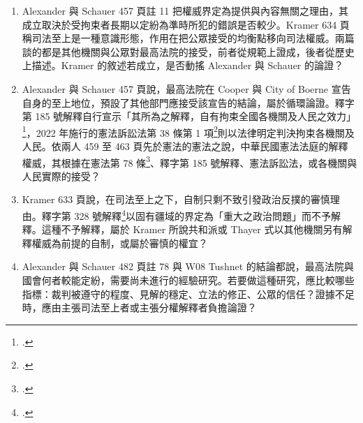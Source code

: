 \begin{enumerate}
\def\labelenumi{\arabic{enumi}.}
\tightlist
\item
  Alexander 與 Schauer 457 頁註 11 把權威界定為提供與內容無關之理由，其成立取決於受拘束者長期以定紛為準時所犯的錯誤是否較少。Kramer 634 頁稱司法至上是一種意識形態，作用在把公眾接受的均衡點移向司法權威。兩篇談的都是其他機關與公眾對最高法院的接受，前者從規範上證成，後者從歷史上描述。Kramer 的敘述若成立，是否動搖 Alexander 與 Schauer 的論證？
\item
  Alexander 與 Schauer 457 頁說，最高法院在 Cooper 與 City of Boerne 宣告自身的至上地位，預設了其他部門應接受該宣告的結論，屬於循環論證。釋字第 185 號解釋自行宣示「其所為之解釋，自有拘束全國各機關及人民之效力」\footcite{jy185}，2022 年施行的憲法訴訟法第 38 條第 1 項\footcite[第 38 條第 1 項]{csfa}則以法律明定判決拘束各機關及人民。依兩人 459 至 463 頁先於憲法的憲法之說，中華民國憲法法庭的解釋權威，其根據在憲法第 78 條\footcite[第 78 條]{roc-constitution}、釋字第 185 號解釋、憲法訴訟法，或各機關與人民實際的接受？
\item
  Kramer 633 頁說，在司法至上之下，自制只剩不致引發政治反撲的審慎理由。釋字第 328 號解釋\footcite{jy328}以固有疆域的界定為「重大之政治問題」而不予解釋。這種不予解釋，屬於 Kramer 所說共和派或 Thayer 式以其他機關另有解釋權威為前提的自制，或屬於審慎的權宜？
\item
  Alexander 與 Schauer 482 頁註 78 與 W08 Tushnet 的結論都說，最高法院與國會何者較能定紛，需要尚未進行的經驗研究。若要做這種研究，應比較哪些指標：裁判被遵守的程度、見解的穩定、立法的修正、公眾的信任？證據不足時，應由主張司法至上者或主張分權解釋者負擔論證？

\end{enumerate}
